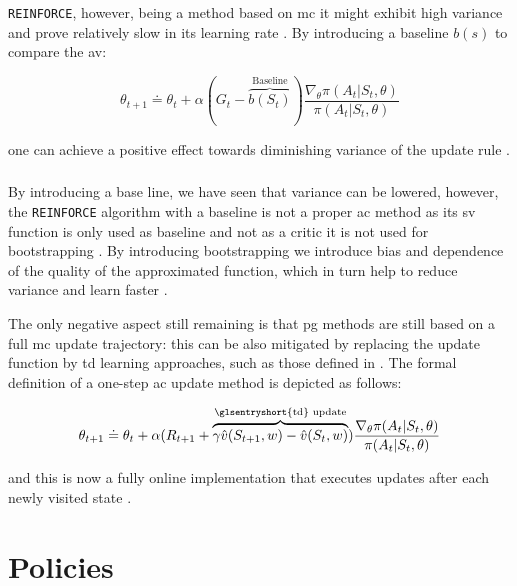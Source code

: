 \texttt{REINFORCE}, however, being a method based on \gls{mc} it might exhibit high variance and prove relatively slow in its learning rate \citep[p. 271]{Sutton2017}. By introducing a baseline $b(s)$ to compare the \gls{av}:

\begin{equation}
	\theta_{t+1} \doteq \theta_t + \alpha (G_t - \overbrace{b(S_t)}^{\text{Baseline}}) \frac{\nabla_\theta \pi(A_t|S_t,\theta)}{\pi(A_t|S_t,\theta)}
\end{equation}

one can achieve a positive effect towards diminishing variance of the update rule \citep[p. 271]{Sutton2017}.

\subsubsection{ }

By introducing a base line, we have seen that variance can be lowered, however, the \texttt{REINFORCE} algorithm with a baseline is not a proper \gls{ac} method as its \gls{sv} function is only used as baseline and not as a critic \ie it is not used for bootstrapping \citep[p. 273]{Sutton2017}. By introducing bootstrapping we introduce bias and dependence of the quality of the approximated function, which in turn help to reduce variance and learn faster \citep[p. 273]{Sutton2017}. 

The only negative aspect still remaining is that \gls{pg} methods are still based on a full \gls{mc} update trajectory: this can be also mitigated by replacing the update function by \gls{td} learning approaches, such as those defined in  \citep[p. 273]{Sutton2017}. The formal definition of a one-step \gls{ac} update method is depicted as follows:

\begin{equation}
	\theta_{t+1} \doteq \theta_t + \alpha(R_{t+1} + \overbrace{\gamma \hat{v}(S_{t+1},w)-\hat{v}(S_t,w)}^{\text{\glsentryshort{td} update}}) \frac{\nabla_\theta \pi(A_t|S_t,\theta)}{\pi(A_t|S_t,\theta)}
\end{equation}

and this is now a fully online implementation that executes updates after each newly visited state \citep[p. 274]{Sutton2017}. 

\section{ Policies}
\label{sec:rl_policies}

